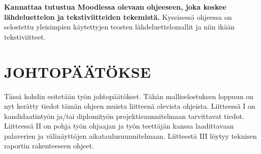 \documentclass{LUT_pohja}[2016/03/09 LUT Dippa Pohja]
\begin{document}
\textbf{Kannattaa tutustua Moodlessa olevaan ohjeeseen, joka koskee lähdeluettelon ja 
tekstiviitteiden tekemistä.} Kyseisessä ohjeessa  on selostettu yleisimpien käytettyjen 
teosten lähdeluettelomallit ja niin ikään tekstiviitteet. 
\newpage
\section{JOHTOPÄÄTÖKSE}

Tässä kohdin esitetään työn johtopäätökset. Tähän malliselostuksen loppuun on nyt kerätty tiedot tämän ohjeen muista liitteenä olevista ohjeista. Liitteessä I on kandidaatintyön ja/tai diplomityön projektisuunnitelmaan tarvittavat tiedot. Liitteessä II on pohja työn ohjaajan ja työn teettäjän kanssa  laadittavaan palaverien  ja välinäyttöjen aikataulusuunnitelmaan. Liitteestä III löytyy teknisen raportin rakenteeseen ohjeet. 
\end{document}
